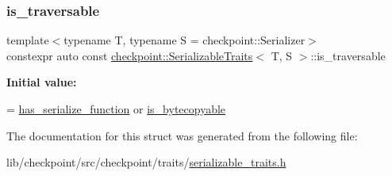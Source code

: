 \subsubsection{\texorpdfstring{is\+\_\+traversable}{is\_traversable}}
{\footnotesize\ttfamily template$<$typename T, typename S = checkpoint\+::\+Serializer$>$ \\
constexpr auto const \hyperlink{structcheckpoint_1_1_serializable_traits}{checkpoint\+::\+Serializable\+Traits}$<$ T, S $>$\+::is\+\_\+traversable\hspace{0.3cm}{\ttfamily [static]}}

{\bfseries Initial value\+:}
\begin{DoxyCode}
=
    \hyperlink{structcheckpoint_1_1_serializable_traits_a4d17a7627a8e033cccb5cf4e6b8fd0dc}{has\_serialize\_function} or \hyperlink{structcheckpoint_1_1_serializable_traits_a19e58ea0f510be10502e476258ed14ae}{is\_bytecopyable}
\end{DoxyCode}


The documentation for this struct was generated from the following file\+:\begin{DoxyCompactItemize}
\item 
lib/checkpoint/src/checkpoint/traits/\hyperlink{serializable__traits_8h}{serializable\+\_\+traits.\+h}\end{DoxyCompactItemize}
